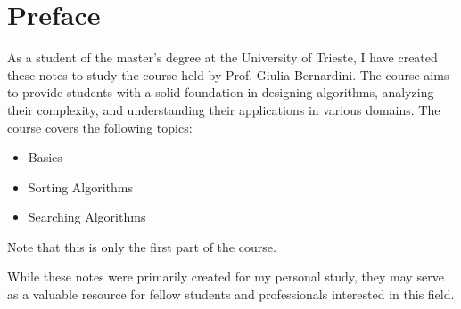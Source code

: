 
\chapter*{Preface}

As a student of the  master's degree at the University of Trieste, I have created these notes to study the course  held by Prof. Giulia Bernardini. The course aims to provide students with a solid foundation in designing algorithms, analyzing their complexity, and understanding their applications in various domains.
The course covers the following topics:
\begin{itemize}
    \item Basics
    \item Sorting Algorithms
    \item Searching Algorithms
\end{itemize}
Note that this is only the first part of the course.

While these notes were primarily created for my personal study, they may serve as a valuable resource for fellow students and professionals interested in this field.
